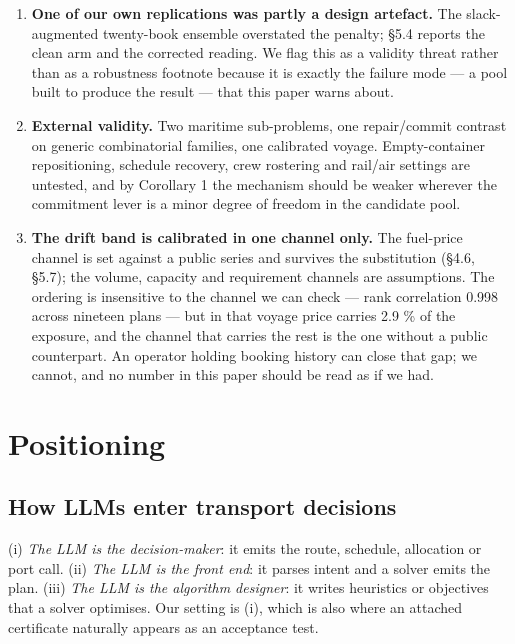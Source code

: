 \documentclass[preprint,12pt,letterpaper]{elsarticle}
\theoremstyle{definition}
\theoremstyle{plain}
\begin{document}
\begin{enumerate}
\item \textbf{One of our own replications was partly a design artefact.} The slack-augmented twenty-book ensemble overstated the penalty; \S 5.4 reports the clean arm and the corrected reading. We flag this as a validity threat rather than as a robustness footnote because it is exactly the failure mode --- a pool built to produce the result --- that this paper warns about.
\item \textbf{External validity.} Two maritime sub-problems, one repair/commit contrast on generic combinatorial families, one calibrated voyage. Empty-container repositioning, schedule recovery, crew rostering and rail/air settings are untested, and by Corollary 1 the mechanism should be weaker wherever the commitment lever is a minor degree of freedom in the candidate pool.
\item \textbf{The drift band is calibrated in one channel only.} The fuel-price channel is set against a public series and survives the substitution (\S 4.6, \S 5.7); the volume, capacity and requirement channels are assumptions. The ordering is insensitive to the channel we can check --- rank correlation 0.998 across nineteen plans --- but in that voyage price carries 2.9 \% of the exposure, and the channel that carries the rest is the one without a public counterpart. An operator holding booking history can close that gap; we cannot, and no number in this paper should be read as if we had.
\end{enumerate}

\section{Positioning}

\subsection{How LLMs enter transport decisions}

(i) \textit{The LLM is the decision-maker}: it emits the route, schedule, allocation or port call. (ii) \textit{The LLM is the front end}: it parses intent and a solver emits the plan. (iii) \textit{The LLM is the algorithm designer}: it writes heuristics or objectives that a solver optimises. Our setting is (i), which is also where an attached certificate naturally appears as an acceptance test.
\end{document}
